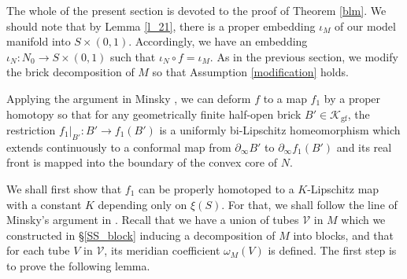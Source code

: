 \documentclass{amsart}
\theoremstyle{definition}
\numberwithin{figure}{section}
\numberwithin{equation}{section}
\def\ck{\mathcal{K}}
\def\cv{\mathcal{V}}
\def\part{\partial}
\begin{document}
The whole of the present section is devoted to the proof of Theorem \ref{blm}.
We should note that by Lemma \ref{l_21}, there is a proper embedding $\iota_M$ of our model manifold into $S \times (0,1)$.
Accordingly, we have an embedding $\iota_N: N_0 \rightarrow S \times (0,1)$ such that $\iota_N \circ f= \iota_M$.
As in the previous section, we modify the brick decomposition of $M$ so that Assumption \ref{modification} holds.

Applying the argument in Minsky \cite[Subsections 3.4 and 8.3]{mi2}, we can deform $f$ to a map $f_1$ by a 
proper homotopy so that  for any 
geometrically finite half-open brick $B'\in \ck_{\mathrm{gf}}$, the restriction $f_1|_{B'}:B'\rightarrow f_1(B')$ is a uniformly bi-Lipschitz homeomorphism 
which extends continuously to a conformal map from $\part_\infty B'$ to $\part_\infty f_1(B')$ and its real front is mapped into the boundary of the convex core of $N$.

We shall first show that $f_1$ can be properly homotoped to a  $K$-Lipschitz map with a constant $K$ depending only on $\xi(S)$.
For that, we shall follow the line of  Minsky's  argument in \cite{mi2}.
Recall that we have a union of tubes $\cv$ in $M$ which we constructed in \S\ref{SS_block} inducing a decomposition of  $M$ into blocks, and that for each tube $V$ in $\cv$, its meridian coefficient $\omega_M(V)$ is defined.
The first step is to prove the following lemma.
\end{document}

